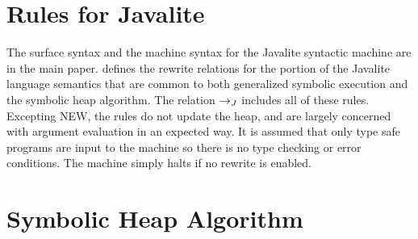 \section{Rules for Javalite}\label{app:javalite}



The surface syntax and the machine syntax for the Javalite syntactic
machine are in the main paper.  defines
the rewrite relations for the portion of the Javalite language
semantics that are common to both generalized symbolic execution and
the symbolic heap algorithm. The relation $\rightarrow_{J}$ includes all of these
rules. Excepting \textrm{N{\footnotesize EW}}, the rules do not update
the heap, and are largely concerned with argument evaluation in an
expected way. It is assumed that only type safe programs are input to
the machine so there is no type checking or error conditions. The
machine simply halts if no rewrite is enabled.


%

%

\section{Symbolic Heap Algorithm}




